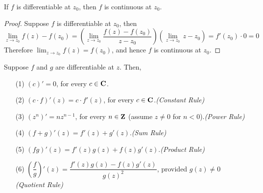 \medskip

\begin{proposition}
If $f$ is differentiable at $z_0$, then $f$ is continuous at $z_0$.
\end{proposition}
\begin{proof}
Suppose $f$ is differentiable at $z_0$, then
\[\lim_{z \to z_0}f(z) - f(z_0) = \left(\lim_{z \to z_0}\frac{f(z) - f(z_0)}{z - z_0}\right)\left(\lim_{z \to z_0}\,z - z_0\right) = f'(z_0)\cdot 0 = 0\]
Therefore $\lim_{z \to z_0}f(z) = f(z_0)$, and hence $f$ is continuous at $z_0$.
\end{proof}

\medskip

\begin{theorem}
Suppose $f$ and $g$ are differentiable at $z$. Then,
\begin{itemize}[itemsep=1em]
\item[(1)] $(c)' = 0$, for every $c \in \mathbf C$.
\item[(2)] $(c\cdot f)'(z) = c\cdot f'(z)$, for every $c \in \mathbf C$.\hfill \emph{(Constant Rule)}
\item[(3)] $(z^n)' = nz^{n-1}$, for every $n \in \mathbf Z$ (assume $z \neq 0$ for $n<0$).\hfill \emph{(Power Rule)}
\item[(4)] $(f + g)'(z) = f'(z) + g'(z)$.\hfill \emph{(Sum Rule)}
\item[(5)] $(fg)'(z) = f'(z)g(z) + f(z)g'(z)$.\hfill \emph{(Product Rule)}
\item[(6)] $\left(\dfrac{f}{g}\right)'(z) = \dfrac{f'(z)g(z) - f(z)g'(z)}{g(z)^2}$, provided $g(z) \neq 0$ \hfill \emph{(Quotient Rule)}
\end{itemize}
\end{theorem}
